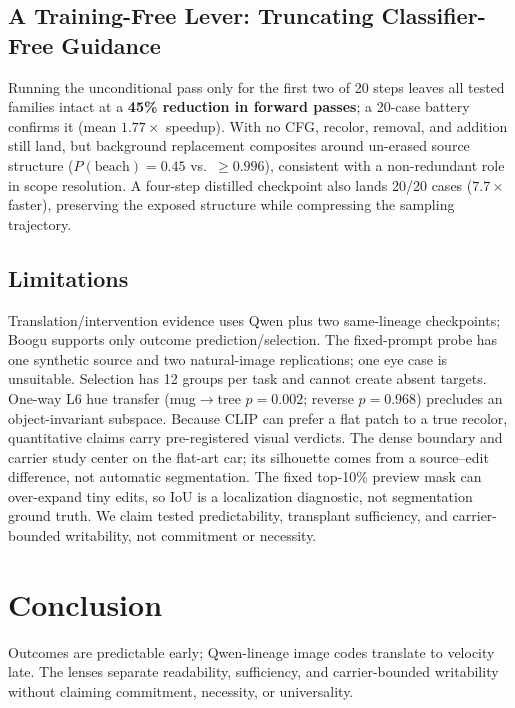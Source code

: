 \documentclass[letterpaper]{article} %
\begin{document}
\subsection{A Training-Free Lever: Truncating Classifier-Free Guidance}\label{sec:lever}

Running the unconditional pass only for the first two of 20 steps leaves all
tested families intact at a \textbf{45\% reduction in forward passes}; a
20-case battery confirms it (mean $1.77\times$ speedup). With no CFG, recolor,
removal, and addition still land, but background replacement composites around
un-erased source structure ($P(\text{beach}){=}0.45$ vs.\ ${\ge}0.996$),
consistent with a non-redundant role in scope resolution. A four-step distilled
checkpoint also lands 20/20 cases ($7.7\times$ faster), preserving the exposed
structure while compressing the sampling trajectory.

\subsection{Limitations}\label{sec:limits}

Translation/intervention evidence uses Qwen plus two same-lineage checkpoints;
Boogu supports only outcome prediction/selection. The fixed-prompt probe has
one synthetic source and two natural-image replications; one eye case is
unsuitable. Selection has 12 groups per task and cannot create absent targets.
One-way L6 hue transfer (mug$\to$tree $p{=}0.002$; reverse $p{=}0.968$)
precludes an object-invariant subspace. Because CLIP can prefer a flat patch to
a true recolor, quantitative claims carry pre-registered visual verdicts. The
dense boundary and carrier study center on the flat-art car; its silhouette
comes from a source--edit difference, not automatic segmentation. The fixed
top-10\% preview mask can over-expand tiny edits, so IoU is a localization
diagnostic, not segmentation ground truth. We claim tested predictability,
transplant sufficiency, and carrier-bounded writability, not commitment or
necessity.

\section{Conclusion}\label{sec:conclusion}

Outcomes are predictable early; Qwen-lineage image codes translate to velocity
late. The lenses separate readability, sufficiency, and carrier-bounded
writability without claiming commitment, necessity, or universality.

\clearpage

\end{document}
